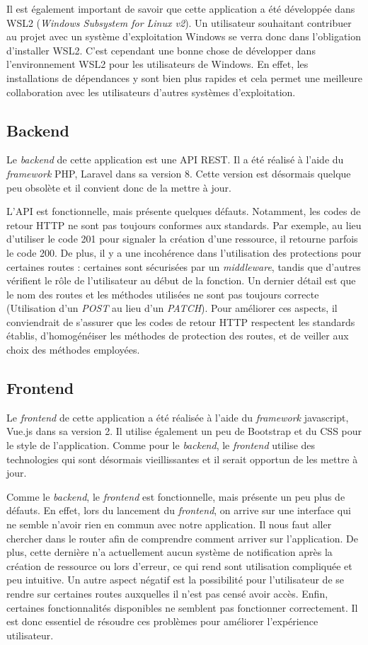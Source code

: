 Il est également important de savoir que cette application a été développée dans WSL2 (\emph{Windows Subsystem for Linux v2}). Un utilisateur souhaitant contribuer au projet avec un système d'exploitation Windows se verra donc dans l'obligation d'installer WSL2.
C'est cependant une bonne chose de développer dans l'environnement WSL2 pour les utilisateurs de Windows. En effet, les installations de dépendances y sont bien plus rapides et cela permet une meilleure collaboration avec les utilisateurs d'autres systèmes d'exploitation.

\subsection{Backend}
Le \emph{backend} de cette application est une API REST. Il a été réalisé à l'aide du \emph{framework} PHP, Laravel dans sa version 8. Cette version est désormais quelque peu obsolète et il convient donc de la mettre à jour.

L'API est fonctionnelle, mais présente quelques défauts. Notamment, les codes de retour HTTP ne sont pas toujours conformes aux standards. Par exemple, au lieu d'utiliser le code 201 pour signaler la création d'une ressource, il retourne parfois le code 200. De plus, il y a une incohérence dans l'utilisation des protections pour certaines routes : certaines sont sécurisées par un \emph{middleware}, tandis que d'autres vérifient le rôle de l'utilisateur au début de la fonction. Un dernier détail est que le nom des routes et les méthodes utilisées ne sont pas toujours correcte (Utilisation d'un \emph{POST} au lieu d'un \emph{PATCH}). Pour améliorer ces aspects, il conviendrait de s'assurer que les codes de retour HTTP respectent les standards établis, d'homogénéiser les méthodes de protection des routes, et de veiller aux choix des méthodes employées.

\subsection{Frontend}
Le \emph{frontend} de cette application a été réalisée à l'aide du \emph{framework} javascript, Vue.js dans sa version 2. Il utilise également un peu de Bootstrap et du CSS pour le style de l'application. Comme pour le \emph{backend}, le \emph{frontend} utilise des technologies qui sont désormais vieillissantes et il serait opportun de les mettre à jour.

Comme le \emph{backend}, le \emph{frontend} est fonctionnelle, mais présente un peu plus de défauts. En effet, lors du lancement du \emph{frontend}, on arrive sur une interface qui ne semble n'avoir rien en commun avec notre application. Il nous faut aller chercher dans le router afin de comprendre comment arriver sur l'application. De plus, cette dernière n'a actuellement aucun système de notification après la création de ressource ou lors d'erreur, ce qui rend sont utilisation compliquée et peu intuitive. Un autre aspect négatif est la possibilité pour l'utilisateur de se rendre sur certaines routes auxquelles il n'est pas censé avoir accès. Enfin, certaines fonctionnalités disponibles ne semblent pas fonctionner correctement. Il est donc essentiel de résoudre ces problèmes pour améliorer l'expérience utilisateur.

